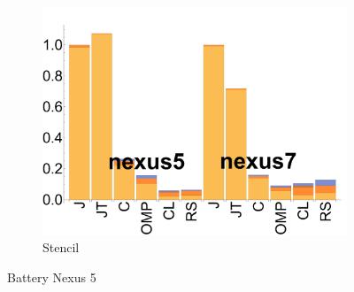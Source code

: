 \begin{figure}[ht]
  \begin{subfigure}[b]{0.3\textwidth}
      \includegraphics[width=\textwidth]{data/bbattery_stencil.pdf}
      \caption{Stencil} \label{fig:b_Stencil}
  \end{subfigure}

  \caption{Battery Nexus 5}
\end{figure}


% 
% 
% 
% 
% 
% 
% 
% 

